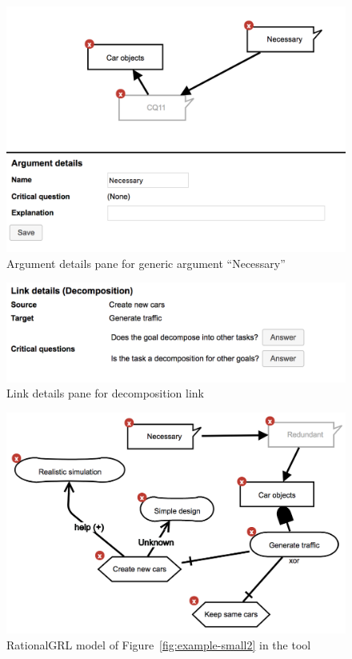 \begin{figure}[ht]
\centering
\includegraphics[scale=0.5]{img/tool-argument}
\caption{Argument details pane for generic argument ``Necessary''}
\label{fig:tool:argument}
\end{figure}

\begin{figure}[ht]
\centering
\includegraphics[scale=0.5]{img/tool-linkdetails}
\caption{Link details pane for decomposition link}
\label{fig:tool:cqdetails}
\end{figure}

\newpage

\begin{figure}[ht]
\centering
\includegraphics[scale=0.6]{img/tool-figfrompaper}
\caption{RationalGRL model of Figure~\ref{fig:example-small2} in the tool}
\label{fig:tool:figfrompaper}
\end{figure}

